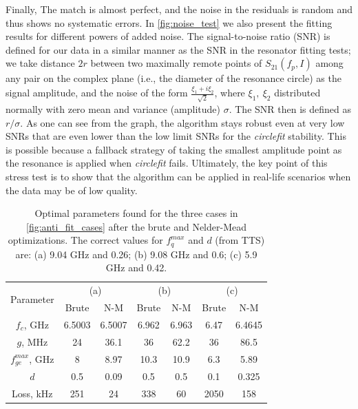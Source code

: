 \documentclass[%
 aip,
 amsmath,amssymb,
 reprint,%
]{revtex4-1}
\begin{document}
Finally, The match is almost perfect, and the noise in the residuals is random and thus shows no systematic errors. In \autoref{fig:noise_test} we also present the fitting results for different powers of added noise. The signal-to-noise ratio (SNR) is defined for our data in a similar manner as the SNR in the resonator fitting tests\cite{probst2015}; we take distance $2r$ between two maximally remote points of $S_{21}(f_p, I)$ among any pair on the complex plane (i.e., the diameter of the resonance circle) as the signal amplitude, and the noise of the form $\frac{\xi_1+i\xi_2}{\sqrt 2}$, where $\xi_1,\ \xi_2$ distributed normally with zero mean and variance (amplitude) $\sigma$. The SNR then is defined as $r/\sigma$. As one can see from the graph, the algorithm stays robust even at very low SNRs that are even lower than the low limit SNRs for the \textit{circlefit} stability. This is possible because a fallback strategy of taking the smallest amplitude point as the resonance is applied when \textit{circlefit} fails. Ultimately, the key point of this stress test is to show that the algorithm can be applied in real-life scenarios when the data may be of low quality.
\begin{table}[b]
	\centering
	\begin{ruledtabular}
		\begin{tabular}{c|cc|cc|cc} 
			\multirow{2}{*}{Parameter} & 
			\multicolumn{2}{c}{(a)} & 
			\multicolumn{2}{c}{(b)} & \multicolumn{2}{c}{(c)}\\
			& Brute & N-M & Brute & N-M & Brute& N-M\\
			\hline
			$f_c$, GHz &6.5003 & 6.5007 & 6.962 & 6.963 &  6.47 & 6.4645\\ 
			$g$, MHz & 24 & 36.1 & 36 & 62.2 & 36 & 86.5\\
			$f_{ge}^{max}$, GHz & 8 &8.97 &10.3& 10.9& 6.3& 5.89\\
			$d$ &0.5&0.09&0.5&0.5&0.1& 0.325 \\\hline
			Loss, kHz & 251 & 24 &338& 60 &2050& 158
		\end{tabular} 
	\end{ruledtabular}
	\caption{Optimal parameters found for the three cases in \autoref{fig:anti_fit_cases} after the brute and Nelder-Mead optimizations. The correct values for $f_q^{max}$ and $d$ (from TTS) are: (a) 9.04 GHz and 0.26; (b) 9.08 GHz and 0.6; (c) 5.9 GHz and 0.42.}
	\label{tab:sts_results}
\end{table}
\end{document}
